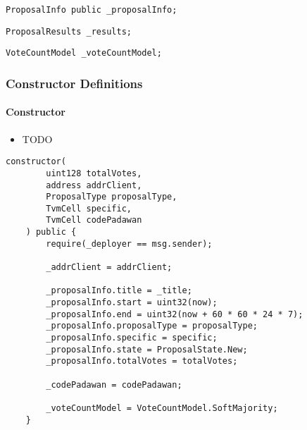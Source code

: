 \begin{lstlisting}[firstnumber=18]
    ProposalInfo public _proposalInfo;
\end{lstlisting}

\begin{lstlisting}[firstnumber=20]
    ProposalResults _results;
\end{lstlisting}

\begin{lstlisting}[firstnumber=21]
    VoteCountModel _voteCountModel;
\end{lstlisting}

\subsubsection{Constructor Definitions}


\paragraph{Constructor}

\begin{itemize}
\item TODO
\end{itemize}

\begin{lstlisting}[firstnumber=25]
    constructor(
        uint128 totalVotes,
        address addrClient,
        ProposalType proposalType,
        TvmCell specific,
        TvmCell codePadawan
    ) public {
        require(_deployer == msg.sender);

        _addrClient = addrClient;

        _proposalInfo.title = _title;
        _proposalInfo.start = uint32(now);
        _proposalInfo.end = uint32(now + 60 * 60 * 24 * 7);
        _proposalInfo.proposalType = proposalType;
        _proposalInfo.specific = specific;
        _proposalInfo.state = ProposalState.New;
        _proposalInfo.totalVotes = totalVotes;

        _codePadawan = codePadawan;

        _voteCountModel = VoteCountModel.SoftMajority;
    }
\end{lstlisting}

